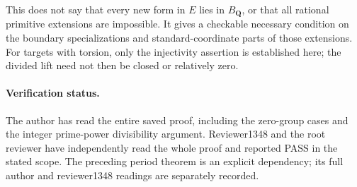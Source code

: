 This does not say that every new form in \(E\) lies in
\(B_{\mathbf Q}\), or that all rational primitive
extensions are impossible. It gives a checkable
necessary condition on the boundary specializations
and standard-coordinate parts of those extensions.
For targets with torsion, only the injectivity
assertion is established here; the divided lift
need not then be closed or relatively zero.

\paragraph{Verification status.}
The author has read the entire saved proof, including
the zero-group cases and the integer prime-power
divisibility argument. Reviewer1348 and the root
reviewer have independently read the whole proof and
reported PASS in the stated scope. The preceding period theorem is an explicit
dependency; its full author and reviewer1348 readings
are separately recorded.

